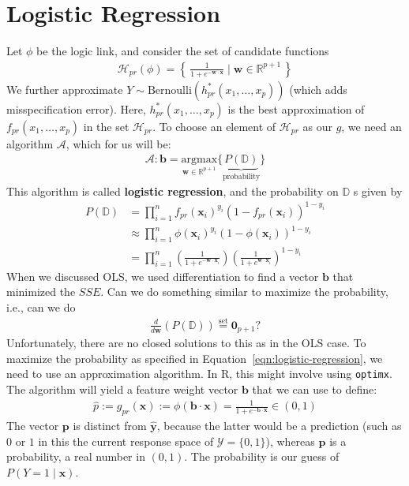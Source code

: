 \documentclass[12pt, a4paper]{article}
\theoremstyle{definition}
\begin{document}
	\section*{Logistic Regression}
	Let $\phi$ be the logic link, and consider the set of candidate functions
	\begin{align*}
		\mathcal{H}_{pr}(\phi) = \left\{\,
		\frac{1}{1 + e^{-\bm{w}\cdot\bm{x}}} \mid \bm{w}\in \mathbb{R}^{p+1}
		\,\right\}
	\end{align*}
	We further approximate $Y\sim \text{Bernoulli}(h^*_{pr}(x_1,\ldots,x_p))$ (which adds
	misspecification error). Here, $h^*_{pr}(x_1,\ldots,x_p)$ is the best approximation
	of $f_{pr}(x_1,\ldots,x_p)$ in the set $\mathcal{H}_{pr}$. To choose an element
	of $\mathcal{H}_{pr}$ as our $g$, we need an algorithm $\mathcal{A}$, which
	for us will be:
	\begin{align}
		\mathcal{A}:\bm{b}
		= \underset{\bm{w}\in \mathbb{R}^{p+1}}{\text{argmax}}\{\underbrace{P(\mathbb{D})}_{\text{probability}}\}
		\label{eqn:logistic-regression}
	\end{align}
	This algorithm is called \textbf{logistic regression}, and the probability
	on $\mathbb{D}$ s given by
	\begin{align*}
		P(\mathbb{D}) &= \prod_{i=1}^{n}f_{pr}(\bm{x}_i)^{y_i}(1 - f_{pr}(\bm{x}_i))^{1-y_i}\\
		&\approx \prod_{i=1}^{n}\phi(\bm{x}_i)^{y_i}(1 - \phi(\bm{x}_i))^{1-y_i}\\
		&= \prod_{i=1}^{n}\left(\frac{1}{1 + e^{-\bm{w}\cdot \bm{x}_i}}\right)
		\left(\frac{1}{1 + e^{\bm{w}\cdot \bm{x}_i}}\right)^{1-y_i}
	\end{align*}
	When we discussed OLS, we used differentiation to find a vector $\bm{b}$
	that minimized the $SSE$. Can we do something similar to maximize the probability,
	i.e., can we do
	\begin{align*}
		\frac{d}{d\bm{w}}\left(P(\mathbb{D})\right)\stackrel{\text{set}}{=}\bm{0}_{p+1}?
	\end{align*}
	Unfortunately, there are no closed solutions to this as in the OLS case.
	To maximize the probability as specified in Equation~\ref{eqn:logistic-regression},
	we need to use an approximation algorithm. In R, this might involve using
	\texttt{optimx}. The algorithm will yield a feature weight vector $\bm{b}$
	that we can use to define:
	\begin{align*}
		\hat{p} := g_{pr}(\bm{x}) := \phi(\bm{b}\cdot \bm{x}) = \frac{1}{1 + e^{-\bm{b}\cdot \bm{x}}}
		\in (0,1)
	\end{align*}
	The vector $\bm{p}$ is distinct from $\hat{\bm{y}}$, because the latter would be
	a prediction (such as $0$ or $1$ in this the current response space of $\mathcal{Y}=\{0,1\}$),
	whereas $\bm{p}$ is a probability, a real number in $(0,1)$. The probability
	is our guess of $P(Y=1\mid \bm{x})$.
	
\end{document}
